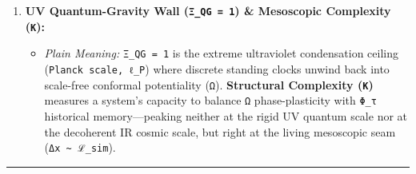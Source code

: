 \documentclass[
]{article}
\providecommand{\tightlist}{%
  \setlength{\itemsep}{0pt}\setlength{\parskip}{0pt}}
\begin{document}
\begin{enumerate}
  \begin{itemize}
  \item
    \textbf{\texttt{Object-as-Object}:} Intrinsic physical reality
    acting on itself (\texttt{the~uninterrupted~ontic~Now}, holding no
    projected timeline).
  \item
    \textbf{\texttt{Object-as-Subject}:} Any physical clock
    (\texttt{an~atom}, \texttt{a~detector}) registering comparative
    cadences strictly \emph{in loco} inside its thick present
    (\texttt{ℒ\_sim}).
  \item
    \textbf{\texttt{Subject-as-Object}:} A conscious being viewed as an
    embodied, finite physical organism (\texttt{body/brain},
    \texttt{\textasciitilde{}300~K}, \texttt{ℒ\_sim~≈~1.21~μm}) anchored
    in the ontic present.
  \item
    \textbf{\texttt{Subject-as-Subject}:} Reflective human
    consciousness---an all-or-nothing representational horizon
    (\texttt{-∞~←~Now~→~+∞}) on a distinct plane from the body,
    characterized by felt variable tick rates and smearing the single
    ontic \texttt{Now} across an unbounded past and future. Because the
    ontic substrate holds \emph{only} the uninterrupted present
    (\texttt{state~X}), \textbf{every domain built upon memory,
    projection, meaning, or value---history, aesthetics, economics,
    ethics, and theoretical science itself---exists exclusively within
    the \texttt{subject-as-subject}'s mode of existence}.
  \end{itemize}
\item
  \textbf{UV Quantum-Gravity Wall (\texttt{Ξ\_QG~=~1}) \& Mesoscopic
  Complexity (\texttt{K}):}

  \begin{itemize}
  \tightlist
  \item
    \emph{Plain Meaning:} \texttt{Ξ\_QG~=~1} is the extreme ultraviolet
    condensation ceiling (\texttt{Planck~scale,~ℓ\_P}) where discrete
    standing clocks unwind back into scale-free conformal potentiality
    (\texttt{Ω}). \textbf{Structural Complexity (\texttt{K})} measures a
    system's capacity to balance \texttt{Ω} phase-plasticity with
    \texttt{Φ\_τ} historical memory---peaking neither at the rigid UV
    quantum scale nor at the decoherent IR cosmic scale, but right at
    the living mesoscopic seam (\texttt{Δx~\textasciitilde{}~ℒ\_sim}).
  \end{itemize}
\end{enumerate}

\begin{center}\rule{0.5\linewidth}{0.5pt}\end{center}
\end{document}
